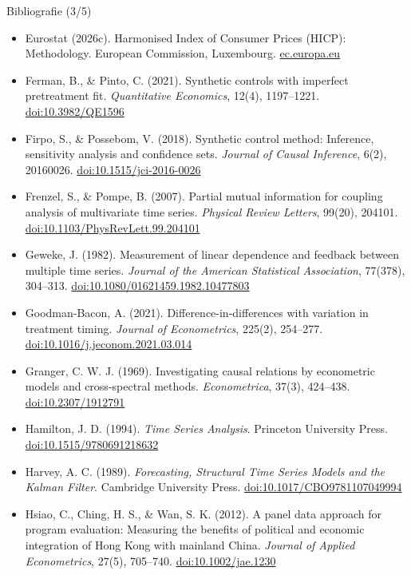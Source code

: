 \begin{frame}{Bibliografie (3/5)}
\itemsize{\tiny}
\begin{itemize}
    \item Eurostat (2026c). Harmonised Index of Consumer Prices (HICP): Methodology. European Commission, Luxembourg. \href{https://ec.europa.eu/eurostat/web/hicp/methodology}{ec.europa.eu}
    \item Ferman, B., \& Pinto, C. (2021). Synthetic controls with imperfect pretreatment fit. \textit{Quantitative Economics}, 12(4), 1197--1221. \href{https://doi.org/10.3982/QE1596}{doi:10.3982/QE1596}
    \item Firpo, S., \& Possebom, V. (2018). Synthetic control method: Inference, sensitivity analysis and confidence sets. \textit{Journal of Causal Inference}, 6(2), 20160026. \href{https://doi.org/10.1515/jci-2016-0026}{doi:10.1515/jci-2016-0026}
    \item Frenzel, S., \& Pompe, B. (2007). Partial mutual information for coupling analysis of multivariate time series. \textit{Physical Review Letters}, 99(20), 204101. \href{https://doi.org/10.1103/PhysRevLett.99.204101}{doi:10.1103/PhysRevLett.99.204101}
    \item Geweke, J. (1982). Measurement of linear dependence and feedback between multiple time series. \textit{Journal of the American Statistical Association}, 77(378), 304--313. \href{https://doi.org/10.1080/01621459.1982.10477803}{doi:10.1080/01621459.1982.10477803}
    \item Goodman-Bacon, A. (2021). Difference-in-differences with variation in treatment timing. \textit{Journal of Econometrics}, 225(2), 254--277. \href{https://doi.org/10.1016/j.jeconom.2021.03.014}{doi:10.1016/j.jeconom.2021.03.014}
    \item Granger, C. W. J. (1969). Investigating causal relations by econometric models and cross-spectral methods. \textit{Econometrica}, 37(3), 424--438. \href{https://doi.org/10.2307/1912791}{doi:10.2307/1912791}
    \item Hamilton, J. D. (1994). \textit{Time Series Analysis}. Princeton University Press. \href{https://doi.org/10.1515/9780691218632}{doi:10.1515/9780691218632}
    \item Harvey, A. C. (1989). \textit{Forecasting, Structural Time Series Models and the Kalman Filter}. Cambridge University Press. \href{https://doi.org/10.1017/CBO9781107049994}{doi:10.1017/CBO9781107049994}
    \item Hsiao, C., Ching, H. S., \& Wan, S. K. (2012). A panel data approach for program evaluation: Measuring the benefits of political and economic integration of Hong Kong with mainland China. \textit{Journal of Applied Econometrics}, 27(5), 705--740. \href{https://doi.org/10.1002/jae.1230}{doi:10.1002/jae.1230}

\end{itemize}
\end{frame}
